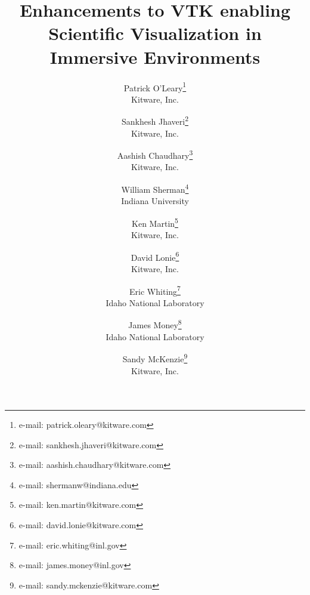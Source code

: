 \title{Enhancements to VTK enabling\\ Scientific Visualization in Immersive Environments}

\author{Patrick O'Leary\thanks{e-mail: patrick.oleary@kitware.com}\\ %
        \scriptsize Kitware, Inc. %
\and Sankhesh Jhaveri\thanks{e-mail: sankhesh.jhaveri@kitware.com}\\ %
        \scriptsize Kitware, Inc. %
\and Aashish Chaudhary\thanks{e-mail: aashish.chaudhary@kitware.com}\\ %
        \scriptsize Kitware, Inc. %
\and William Sherman\thanks{e-mail: shermanw@indiana.edu}\\ %
        \scriptsize Indiana University %
\and Ken Martin\thanks{e-mail: ken.martin@kitware.com}\\ %
        \scriptsize Kitware, Inc. %
\and David Lonie\thanks{e-mail: david.lonie@kitware.com}\\ %
        \scriptsize Kitware, Inc. %
\and Eric Whiting\thanks{e-mail: eric.whiting@inl.gov}\\ %
        \scriptsize Idaho National Laboratory %
\and James Money\thanks{e-mail: james.money@inl.gov}\\ %
        \scriptsize Idaho National Laboratory %
\and Sandy McKenzie\thanks{e-mail: sandy.mckenzie@kitware.com}\\ %
        \scriptsize Kitware, Inc. %
        }
